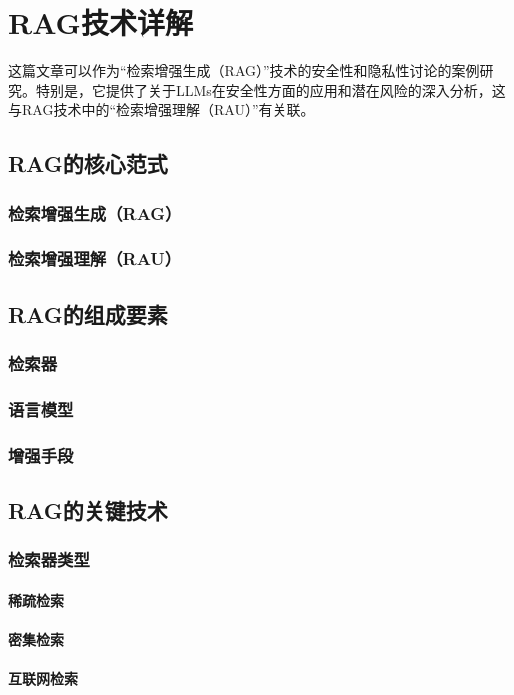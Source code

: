 \chapter{RAG技术详解}
这篇文章可以作为“检索增强生成（RAG）”技术的安全性和隐私性讨论的案例研究。特别是，它提供了关于LLMs在安全性方面的应用和潜在风险的深入分析，这与RAG技术中的“检索增强理解（RAU）”有关联。~\cite{Yao2024}

\section{RAG的核心范式}
\subsection{检索增强生成（RAG）}
\subsection{检索增强理解（RAU）}

\section{RAG的组成要素}
\subsection{检索器}
\subsection{语言模型}
\subsection{增强手段}

\section{RAG的关键技术}
\subsection{检索器类型}
\subsubsection{稀疏检索}
\subsubsection{密集检索}
\subsubsection{互联网检索}
